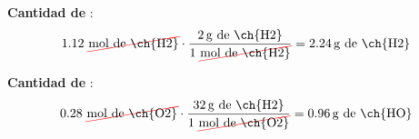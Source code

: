 \begin{enumerate}[label=\numberballmDarkTeal]
\begin{itemize}
            \textbf{Cantidad de }:
            \begin{equation*}
                1.12\ \cancelred{\unit{\mol}\ \text{de \ch{H2}}} \cdot \dfrac{\qty{2}{\g}\ \text{de \ch{H2}}}{1\ \cancelred{\unit{\mol} \ \text{de \ch{H2}}}} = \qty{2.24}{\g}\ \text{de \ch{H2}}
            \end{equation*}

            \textbf{Cantidad de }:
            \begin{equation*}
                0.28\ \cancelred{\unit{\mol}\ \text{de \ch{O2}}} \cdot \dfrac{\qty{32}{\g}\ \text{de \ch{H2}}}{1\ \cancelred{\unit{\mol} \ \text{de \ch{O2}}}} = \qty{0.96}{\g}\ \text{de \ch{HO}}
            \end{equation*}
        \end{itemize}
\end{enumerate}

